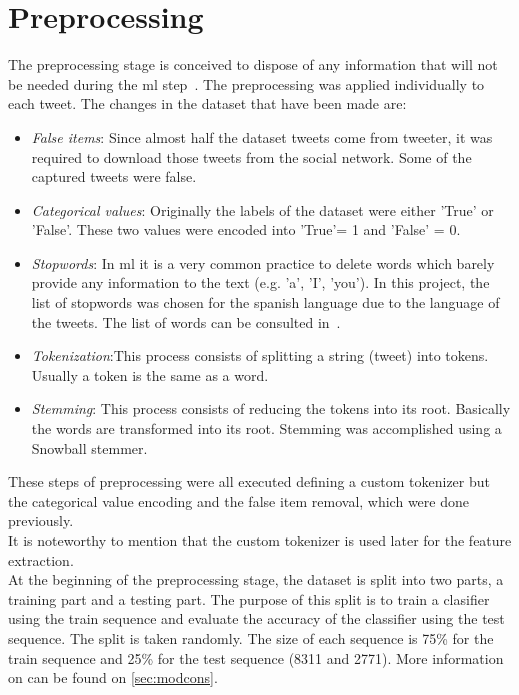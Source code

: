 \section{Preprocessing}
\label{sec:preprocessing}
The preprocessing stage is conceived to dispose of any information that will not be needed during the \ac{ml} step~\cite{preprocess}. The preprocessing was applied individually to each tweet.
The changes in the dataset that have been made are:
\begin{itemize}
	\item \textit{False items}: Since almost half the dataset tweets come from tweeter, it was required to download those tweets from the social network. Some of the captured tweets were false.
	\item \textit{Categorical values}: Originally the labels of the dataset were either 'True' or 'False'. These two values were encoded into 'True'= 1 and 'False' = 0.
	\item \textit{Stopwords}:  In \ac{ml} it is a very common practice to delete words which barely provide any information to the text (e.g. 'a', 'I', 'you'). In this project, the list of stopwords was chosen for the spanish language due to the language of the tweets. The list of words can be consulted in~\cite{stopwords}.
	\item \textit{Tokenization}:This process consists of splitting a string (tweet) into tokens. Usually a token is the same as a word.
	\item 
	\textit{Stemming}: This process consists of reducing the tokens into its root. Basically the words are transformed into its root. Stemming was accomplished using a Snowball stemmer. 
\end{itemize}
These steps of preprocessing were all executed defining a custom tokenizer but the categorical value encoding and the false item removal, which were done previously.\\
It is noteworthy to mention that the custom tokenizer is used later for the feature extraction.\\
At the beginning of the preprocessing stage, the dataset is split into two parts, a training part and a testing part. The purpose of this split is to train a clasifier using the train  sequence and evaluate the accuracy of the classifier using the test sequence. The split is taken randomly. The size of each sequence is 75\% for the train sequence and 25\% for the test sequence (8311 and 2771). More information on can be found on \cref{sec:modcons}.
